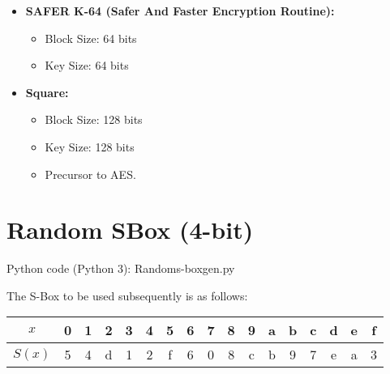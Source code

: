 \documentclass[12pt]{article}
\begin{document}
\begin{large}
\begin{itemize}[itemsep=-1ex, topsep=-1ex]
\item \textbf{SAFER K-64 (Safer And Faster Encryption Routine):}
	\begin{itemize}[itemsep=-2ex, topsep=-2ex]
	\item Block Size: 64 bits
	\item Key Size: 64 bits
	\end{itemize}
	
\item \textbf{Square:}
	\begin{itemize}[itemsep=-2ex, topsep=-2ex]
	\item Block Size: 128 bits
	\item Key Size: 128 bits
	\item Precursor to AES.
	\end{itemize}
	
\end{itemize}

\end{large}

\section{Random SBox (4-bit)}
\begin{large}
Python code (Python 3): Random\textunderscore s-box\textunderscore gen.py


The S-Box to be used subsequently is as follows:
\begin{center}

\begin{tabular}{|c|c|c|c|c|c|c|c|c|c|c|c|c|c|c|c|c|}
\hline
$x$ & 0 & 1 & 2 & 3 & 4 & 5 & 6 & 7 & 8 & 9 & a & b & c & d & e & f\\\hline
$S(x)$ & 5 & 4 & d & 1 & 2 & f & 6 & 0 & 8 & c & b & 9 & 7 & e & a & 3\\\hline
\end{tabular}

\end{center}
\end{large}
\vspace{0.5cm}
\end{document}
